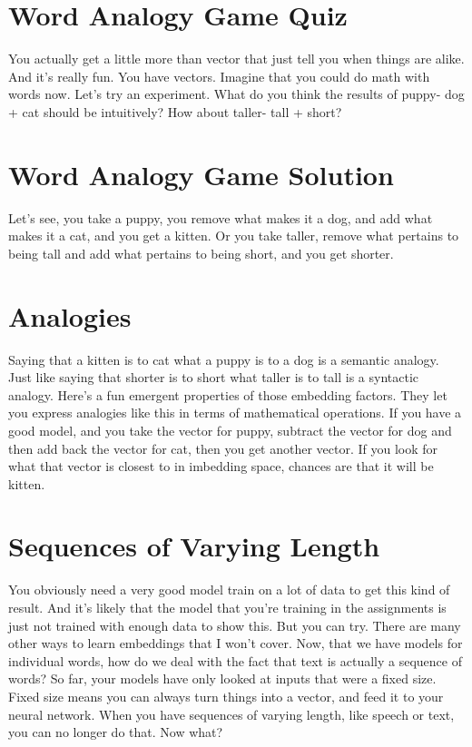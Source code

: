 \documentclass{article}
\begin{document}
\section{Word Analogy Game Quiz}
You actually get a little more than
vector that just tell you when
things are alike.
And it's really fun.
You have vectors.
Imagine that you could
do math with words now.
Let's try an experiment.
What do you think the results of puppy-
dog + cat should be intuitively?
How about taller- tall + short?
\section{Word Analogy Game Solution}
Let's see, you take a puppy,
you remove what makes it a dog, and
add what makes it a cat,
and you get a kitten.
Or you take taller,
remove what pertains to being tall and
add what pertains to being short,
and you get shorter.
\section{Analogies}
Saying that a kitten is to cat what a
puppy is to a dog is a semantic analogy.
Just like saying that shorter is
to short what taller is to tall
is a syntactic analogy.
Here's a fun emergent properties
of those embedding factors.
They let you express analogies like this
in terms of mathematical operations.
If you have a good model, and
you take the vector for puppy,
subtract the vector for
dog and then add back the vector for
cat, then you get another vector.
If you look for what that vector
is closest to in imbedding space,
chances are that it will be kitten.
\section{Sequences of Varying Length}
You obviously need a very good
model train on a lot of data
to get this kind of result.
And it's likely that the model that
you're training in the assignments
is just not trained with
enough data to show this.
But you can try.
There are many other ways to learn
embeddings that I won't cover.
Now, that we have models for
individual words,
how do we deal with the fact that
text is actually a sequence of words?
So far, your models have only looked
at inputs that were a fixed size.
Fixed size means you can always
turn things into a vector, and
feed it to your neural network.
When you have sequences
of varying length,
like speech or text,
you can no longer do that.
Now what?
\end{document}

